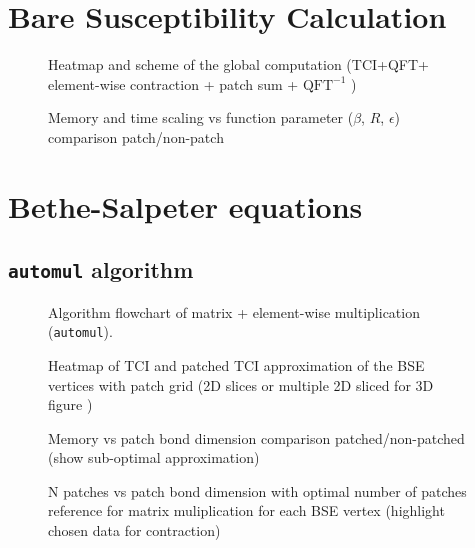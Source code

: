 \section{Bare Susceptibility Calculation}
\label{sec:bubbleCalc}


\begin{figure}[ht!]
    \caption{Heatmap and scheme of the global computation (TCI+QFT+ element-wise contraction + patch sum + $\textrm{QFT}^{-1}$ )}
\end{figure}

\begin{figure}[ht!]
    \caption{Memory and time scaling vs function parameter ($\beta$, $R$, $\epsilon$) comparison patch/non-patch }
\end{figure}



\section{Bethe-Salpeter equations}
\label{sec:patchBSE}

\subsection{\texttt{automul} algorithm}

\begin{figure}[ht!]
    \caption{Algorithm flowchart of matrix + element-wise multiplication\\(\texttt{automul}).}
\end{figure}

\begin{figure}[ht!]
    \caption{Heatmap of TCI and patched TCI approximation of the BSE vertices with patch grid (2D slices or multiple 2D sliced for 3D figure )}
\end{figure}

\begin{figure}[ht!]
    \caption{Memory vs patch bond dimension comparison patched/non-patched (show sub-optimal approximation)}
\end{figure}

\begin{figure}[ht!]
    \caption{N patches vs patch bond dimension with optimal number of patches reference for matrix muliplication for each BSE vertex (highlight chosen data for contraction)}
\end{figure}

